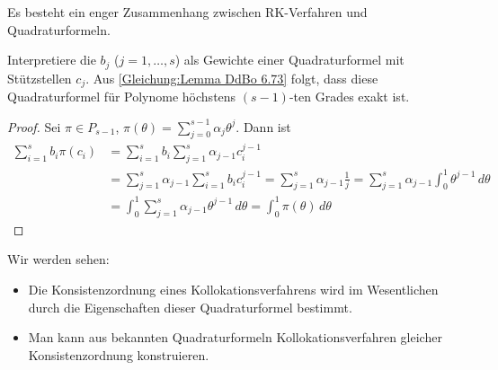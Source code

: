 Es besteht ein enger Zusammenhang zwischen RK-Verfahren und Quadraturformeln.

\begin{lemma}
	Interpretiere die $b_j$ ($j=1,\hdots,s$) als Gewichte einer Quadraturformel mit Stützstellen $c_j$. Aus \eqref{Gleichung:Lemma DdBo 6.73} folgt, dass diese Quadraturformel für Polynome höchstens $(s-1)$-ten Grades exakt ist.
\end{lemma}
\begin{proof}
	Sei $\pi\in P_{s-1}$, $\pi(\theta) = \sum_{j=0}^{s-1}\alpha_j \theta^j$. Dann ist
	\begin{align*}
		\sum_{i=1}^s b_i\pi(c_i) &= \sum_{i=1}^s b_i \sum_{j=1}^s \alpha_{j-1}c_i^{j-1} \\
	                             &= \sum_{j=1}^s \alpha_{j-1}\sum_{i=1}^s b_ic_i^{j-1} = \sum_{j=1}^s \alpha_{j-1}\frac{1}{j} 
	                                     = \sum_{j=1}^s \alpha_{j-1}\int_0^1 \theta^{j-1}\,d\theta \\
	                             &= \int_0^1 \sum_{j=1}^s \alpha_{j-1} \theta^{j-1}\,d\theta = \int_0^1 \pi(\theta)\,d\theta
	\end{align*}
\end{proof}

Wir werden sehen:
\begin{itemize}
	\item Die Konsistenzordnung eines Kollokationsverfahrens wird im Wesentlichen durch die Eigenschaften dieser Quadraturformel bestimmt.
	\item Man kann aus bekannten Quadraturformeln Kollokationsverfahren gleicher Konsistenzordnung konstruieren.
\end{itemize}


